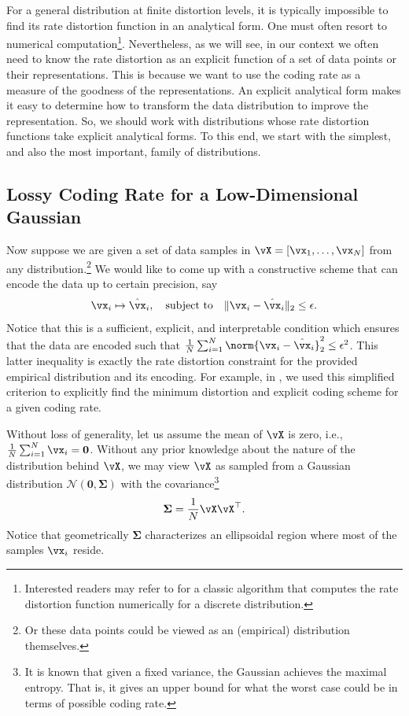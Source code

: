 \documentclass[../../book-main.tex]{subfiles}
\begin{document}
For a general distribution at finite distortion levels, it is
typically impossible to find its rate
distortion function in an analytical form. One must often resort to
numerical computation\footnote{Interested readers may refer to
    \cite{Blahut-1972} for a classic algorithm that computes the rate
distortion function numerically for a discrete distribution.}.
Nevertheless, as we will see, in our context we often need to know
the rate distortion as an explicit function of a set of data points
or their representations. This is because we want to use the coding
rate as a measure of the goodness of the representations. An explicit
analytical form makes it easy to determine how to transform the data
distribution to improve the representation. So, we should work with
distributions whose rate distortion functions take explicit
analytical forms. To this end, we start with the simplest, and also
the most important, family of distributions.

\subsection{Lossy Coding Rate for a Low-Dimensional
Gaussian}\label{subsec:lossy DR}
Now suppose we are given a set of data samples in $\vX = [\vx_1,
\ldots, \vx_N]$ from any distribution.\footnote{Or these data points
could be viewed as an (empirical) distribution themselves.} We would
like to come up with a constructive scheme that can encode the data
up to certain precision, say
\begin{equation}
    \vx_i \mapsto \hat \vx_i, \quad \mbox{subject to} \quad \|\vx_i -
    \hat \vx_i\|_2 \le \epsilon.
\end{equation}
Notice that this is a sufficient, explicit, and interpretable condition which
ensures that the data are encoded such that \(\frac{1}{N}\sum_{i = 1}^{N}
\norm{\vx_i- \hat \vx_i}_2^{2} \le \epsilon^{2}\). This latter
inequality is exactly the rate distortion constraint for the provided
empirical distribution and its encoding. For example, in
, we used this
simplified criterion to explicitly find the minimum distortion and
explicit coding scheme for a given coding rate.

Without loss of generality, let us assume the mean of $\vX$ is zero,
i.e., $\frac{1}{N} \sum_{i = 1}^{N} \vx_i = \boldsymbol{0}$. Without
any prior knowledge about the nature of the distribution behind $\vX$,
we may view $\vX$ as sampled from a Gaussian distribution
$\mathcal{N}(\boldsymbol{0}, {\boldsymbol{\Sigma}})$ with the
covariance\footnote{It is known that given a fixed variance, the
    Gaussian achieves the maximal entropy. That is, it gives an upper
bound for what the worst case could be in terms of possible coding rate.}
\begin{equation}
    {\boldsymbol{\Sigma}} = \frac{1}{N} \vX\vX^\top.
\end{equation}
Notice that geometrically ${\boldsymbol{\Sigma}}$ characterizes an
ellipsoidal region where most of the samples $\vx_i$ reside.
\end{document}
